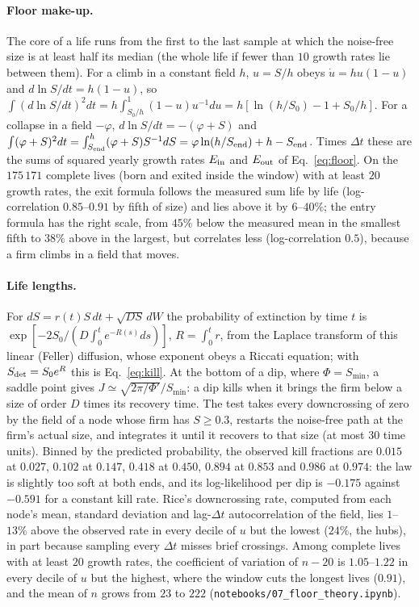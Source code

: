 \documentclass[pre,twocolumn,superscriptaddress,nofootinbib]{revtex4-2}
\begin{document}
\paragraph{Floor make-up.}  The core of a life runs from the first to the last sample at which the noise-free
size is at least half its median (the whole life if fewer than $10$ growth rates lie between them).  For a
climb in a constant field $h$, $u=S/h$ obeys $\dot u=hu(1-u)$ and $d\ln S/dt=h(1-u)$, so
$\int(d\ln S/dt)^2dt=h\int_{S_0/h}^1(1-u)u^{-1}du=h[\ln(h/S_0)-1+S_0/h]$.  For a collapse in a field $-\varphi$,
$d\ln S/dt=-(\varphi+S)$ and $\int(\varphi+S)^2dt=\int_{S_{\rm end}}^h(\varphi+S)S^{-1}dS=\varphi\ln(h/S_{\rm end})+h-S_{\rm end}$.
Times $\Delta t$ these are the sums of squared yearly growth rates $E_{\rm in}$ and $E_{\rm out}$ of Eq.~\eqref{eq:floor}.
On the $175\,171$ complete lives (born and exited inside the window) with at least $20$ growth rates, the
exit formula follows the measured sum life by life (log-correlation $0.85$--$0.91$ by fifth of size) and lies
above it by $6$--$40\%$; the entry formula has the right scale, from $45\%$ below the measured mean in the
smallest fifth to $38\%$ above in the largest, but correlates less (log-correlation $0.5$), because a firm
climbs in a field that moves.

\paragraph{Life lengths.}  For $dS=r(t)S\,dt+\sqrt{DS}\,dW$ the probability of extinction by time $t$ is
$\exp[-2S_0/(D\int_0^te^{-R(s)}ds)]$, $R=\int_0^tr$, from the Laplace transform of this linear (Feller)
diffusion, whose exponent obeys a Riccati equation; with $S_{\rm det}=S_0e^R$ this is Eq.~\eqref{eq:kill}.  At the bottom of a dip, where $\Phi=S_{\min}$, a saddle point gives
$J\simeq\sqrt{2\pi/\Phi'}/S_{\min}$: a dip kills when it brings the firm below a size of order $D$ times its
recovery time.  The test takes every downcrossing of zero by the field of a node whose firm has $S\ge0.3$,
restarts the noise-free path at the firm's actual size, and integrates it until it recovers to that size
(at most $30$ time units).  Binned by the predicted probability, the observed kill fractions are $0.015$ at
$0.027$, $0.102$ at $0.147$, $0.418$ at $0.450$, $0.894$ at $0.853$ and $0.986$ at $0.974$: the law is slightly too soft at
both ends, and its log-likelihood per dip is $-0.175$ against $-0.591$ for a constant kill rate.  Rice's
downcrossing rate, computed from each node's mean, standard deviation and lag-$\Delta t$ autocorrelation of
the field, lies $1$--$13\%$ above the observed rate in every decile of $u$ but the lowest ($24\%$, the hubs), in
part because sampling every $\Delta t$ misses brief crossings.  Among complete lives with at least $20$ growth
rates, the coefficient of variation of $n-20$ is $1.05$--$1.22$ in every decile of $u$ but the highest, where the
window cuts the longest lives ($0.91$), and the mean of $n$ grows from $23$ to $222$ (\texttt{notebooks/07\_floor\_theory.ipynb}).
\end{document}
